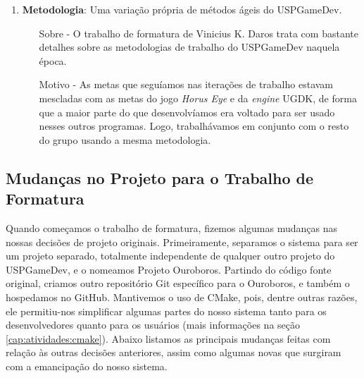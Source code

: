 \begin{enumerate}
    \item \textbf{Metodologia}: Uma variação própria de métodos ágeis do USPGameDev.
      \begin{itemize}
        \item[Sobre -] O trabalho de formatura de Vinicius K. Daros
          \cite{scrum:00} trata com bastante detalhes sobre as metodologias
          de trabalho do USPGameDev naquela época.
        \item[Motivo -] As metas que seguíamos nas iterações de trabalho
          estavam mescladas com as metas do jogo \textit{Horus Eye} e da
          \textit{engine} UGDK, de forma que a maior parte do que
          desenvolvíamos era voltado para ser usado nesses outros
          programas. Logo, trabalhávamos em conjunto com o resto do
          grupo usando a mesma metodologia.
      \end{itemize}

  \end{enumerate}

  \subsection{Mudanças no Projeto para o Trabalho de Formatura}
  Quando começamos o trabalho de formatura, fizemos algumas mudanças nas nossas
  decisões de projeto originais. Primeiramente, separamos o sistema para ser um
  projeto separado, totalmente independente de qualquer outro projeto do
  USPGameDev, e o nomeamos Projeto Ouroboros. Partindo do código fonte
  original, criamos outro repositório Git específico para o Ouroboros, e também
  o hospedamos no GitHub. Mantivemos o uso de CMake, pois, dentre outras razões,
  ele permitiu-nos simplificar algumas partes do nosso sistema tanto para os
  desenvolvedores quanto para os usuários (mais informações na seção
  \ref{cap:atividades:cmake}). Abaixo listamos as principais mudanças feitas
  com relação às outras decisões anteriores, assim como algumas novas que
  surgiram com a emancipação do nosso sistema.
  
